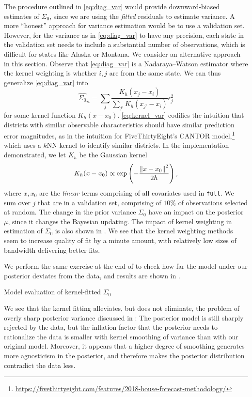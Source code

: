 \documentclass[12pt]{article}
\begin{document}
The procedure outlined in \eqref{eq:diag_var} would provide downward-biased estimates of $\Sigma_0$, since we are using the \emph{fitted} residuals to estimate variance. A more ``honest'' \citep{athey2016recursive} approach for variance estimation would be to use a validation set. However, for the variance as in \eqref{eq:diag_var} to have any precision, each state in the validation set needs to include a substantial number of observations, which is difficult for states like Alaska or Montana. We consider an alternative approach in this section. Observe that \eqref{eq:diag_var} is a Nadaraya--Watson estimator where the kernel weighting is whether $i,j$ are from the same state. We can thus generalize \eqref{eq:diag_var} into 
\begin{equation}
  \hat {\Sigma_0}_{ii} = \sum_j \frac{K_h(x_j - x_i)}{\sum_{j'} K_h(x_{j'} - x_i)}\epsilon_j^2
\label{eq:kernel_var}
\end{equation}
for some kernel function $K_h(x-x_0)$. \eqref{eq:kernel_var} codifies the
intuition that districts with similar observable characteristics should have
similar prediction error magnitudes, as in the intuition for FiveThirtyEight's
CANTOR model,\footnote{\url{https://fivethirtyeight.com/features/2018-house-forecast-methodology/}}
which uses a $k$NN kernel to identify similar districts. In the implementation demonstrated, we let
$K_h$ be the Gaussian kernel \[K_h(x-x_0) \propto
\exp\left({-\frac{\left\lVert x-x_0\right\rVert^2}{2h}}\right),\] where $x, x_0$ are the \emph{linear}
terms comprising of all covariates used in \texttt{full}. We sum over $j$ that
are in a validation set, comprising of $10\%$ of observations selected at
random. The change in the prior variance $\Sigma_0$ have an impact on the
posterior $\mu$, since it changes the Bayesian updating. The impact of kernel
weighting in estimation of $\Sigma_0$ is also shown in . We
see that the kernel weighting methods seem to increase quality of fit by a
minute amount, with relatively low sizes of bandwidth delivering better fits. 

We perform the same exercise at the end of  to check how far
the model under our posterior deviates from the data, and results are shown in .
\begin{table}[tb]
  \caption{Model evaluation of kernel-fitted $\Sigma_0$}
  \label{tab:kernel_res}
  \centering
  \vspace{.4em}
  
\end{table}
We see
that the kernel fitting alleviates, but does not eliminate, the problem of
overly sharp posterior variance discussed in : The posterior
model is still sharply rejected by the data, but the inflation factor that the posterior
needs to rationalize the data is smaller with kernel smoothing of variance than
with our original model. Moreover, it appears that a higher degree of smoothing generates more agnosticism in the posterior, and therefore makes the posterior distribution contradict the data less. 
\end{document}
